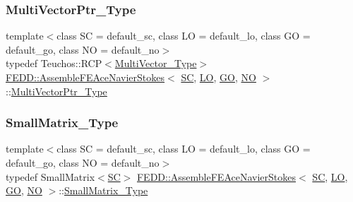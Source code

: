 \subsubsection{\texorpdfstring{Multi\+Vector\+Ptr\+\_\+\+Type}{MultiVectorPtr\_Type}}
{\footnotesize\ttfamily template$<$class SC  = default\+\_\+sc, class LO  = default\+\_\+lo, class GO  = default\+\_\+go, class NO  = default\+\_\+no$>$ \\
typedef Teuchos\+::\+R\+CP$<$\hyperlink{classFEDD_1_1AssembleFEAceNavierStokes_ae3b75de049d1afb35bd03a81d19f4f5a}{Multi\+Vector\+\_\+\+Type}$>$ \hyperlink{classFEDD_1_1AssembleFEAceNavierStokes}{F\+E\+D\+D\+::\+Assemble\+F\+E\+Ace\+Navier\+Stokes}$<$ \hyperlink{fe__test__laplace_8cpp_a79c7e86a57edbb2a5a53242bcd04e41e}{SC}, \hyperlink{fe__test__laplace_8cpp_ad6a38c9f07d3fd633eefca5bccad8410}{LO}, \hyperlink{fe__test__laplace_8cpp_afa2946b509009b4f45eb04bd8c5b27d9}{GO}, \hyperlink{fe__test__laplace_8cpp_a5e24f37b28787429872b6ecb1d0417ce}{NO} $>$\+::\hyperlink{classFEDD_1_1AssembleFEAceNavierStokes_a92495c4e2a54273636a81a594413382a}{Multi\+Vector\+Ptr\+\_\+\+Type}}

\mbox{\label{classFEDD_1_1AssembleFEAceNavierStokes_a12c4d652d692956a7839abbf4c02b26a}} 
\subsubsection{\texorpdfstring{Small\+Matrix\+\_\+\+Type}{SmallMatrix\_Type}}
{\footnotesize\ttfamily template$<$class SC  = default\+\_\+sc, class LO  = default\+\_\+lo, class GO  = default\+\_\+go, class NO  = default\+\_\+no$>$ \\
typedef Small\+Matrix$<$\hyperlink{fe__test__laplace_8cpp_a79c7e86a57edbb2a5a53242bcd04e41e}{SC}$>$ \hyperlink{classFEDD_1_1AssembleFEAceNavierStokes}{F\+E\+D\+D\+::\+Assemble\+F\+E\+Ace\+Navier\+Stokes}$<$ \hyperlink{fe__test__laplace_8cpp_a79c7e86a57edbb2a5a53242bcd04e41e}{SC}, \hyperlink{fe__test__laplace_8cpp_ad6a38c9f07d3fd633eefca5bccad8410}{LO}, \hyperlink{fe__test__laplace_8cpp_afa2946b509009b4f45eb04bd8c5b27d9}{GO}, \hyperlink{fe__test__laplace_8cpp_a5e24f37b28787429872b6ecb1d0417ce}{NO} $>$\+::\hyperlink{classFEDD_1_1AssembleFE_a8b8c588ba0cfaa200a74215f19e62722}{Small\+Matrix\+\_\+\+Type}}

